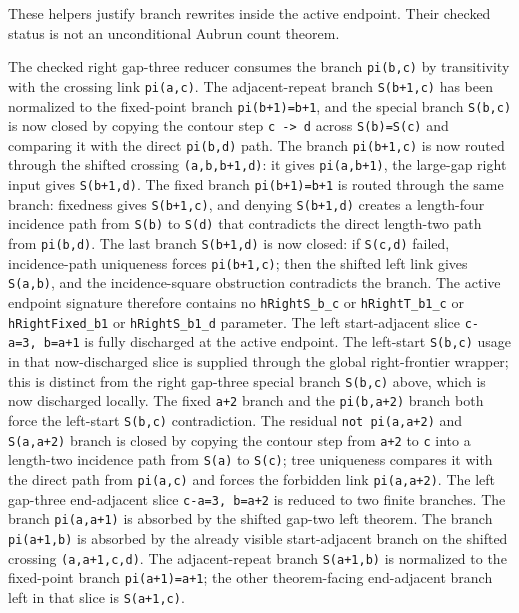 \documentclass[
]{article}
\begin{document}
These helpers justify branch rewrites inside the active endpoint. Their
checked status is not an unconditional Aubrun count theorem.

The checked right gap-three reducer consumes the branch \texttt{pi(b,c)}
by transitivity with the crossing link \texttt{pi(a,c)}. The
adjacent-repeat branch \texttt{S(b+1,c)} has been normalized to the
fixed-point branch \texttt{pi(b+1)=b+1}, and the special branch
\texttt{S(b,c)} is now closed by copying the contour step
\texttt{c\ -\textgreater{}\ d} across \texttt{S(b)=S(c)} and comparing
it with the direct \texttt{pi(b,d)} path. The branch \texttt{pi(b+1,c)}
is now routed through the shifted crossing \texttt{(a,b,b+1,d)}: it
gives \texttt{pi(a,b+1)}, the large-gap right input gives
\texttt{S(b+1,d)}. The fixed branch \texttt{pi(b+1)=b+1} is routed
through the same branch: fixedness gives \texttt{S(b+1,c)}, and denying
\texttt{S(b+1,d)} creates a length-four incidence path from
\texttt{S(b)} to \texttt{S(d)} that contradicts the direct length-two
path from \texttt{pi(b,d)}. The last branch \texttt{S(b+1,d)} is now
closed: if \texttt{S(c,d)} failed, incidence-path uniqueness forces
\texttt{pi(b+1,c)}; then the shifted left link gives \texttt{S(a,b)},
and the incidence-square obstruction contradicts the branch. The active
endpoint signature therefore contains no \texttt{hRightS\_b\_c} or
\texttt{hRightT\_b1\_c} or \texttt{hRightFixed\_b1} or
\texttt{hRightS\_b1\_d} parameter. The left start-adjacent slice
\texttt{c-a=3,\ b=a+1} is fully discharged at the active endpoint. The
left-start \texttt{S(b,c)} usage in that now-discharged slice is
supplied through the global right-frontier wrapper; this is distinct
from the right gap-three special branch \texttt{S(b,c)} above, which is
now discharged locally. The fixed \texttt{a+2} branch and the
\texttt{pi(b,a+2)} branch both force the left-start \texttt{S(b,c)}
contradiction. The residual \texttt{not\ pi(a,a+2)} and
\texttt{S(a,a+2)} branch is closed by copying the contour step from
\texttt{a+2} to \texttt{c} into a length-two incidence path from
\texttt{S(a)} to \texttt{S(c)}; tree uniqueness compares it with the
direct path from \texttt{pi(a,c)} and forces the forbidden link
\texttt{pi(a,a+2)}. The left gap-three end-adjacent slice
\texttt{c-a=3,\ b=a+2} is reduced to two finite branches. The branch
\texttt{pi(a,a+1)} is absorbed by the shifted gap-two left theorem. The
branch \texttt{pi(a+1,b)} is absorbed by the already visible
start-adjacent branch on the shifted crossing \texttt{(a,a+1,c,d)}. The
adjacent-repeat branch \texttt{S(a+1,b)} is normalized to the
fixed-point branch \texttt{pi(a+1)=a+1}; the other theorem-facing
end-adjacent branch left in that slice is \texttt{S(a+1,c)}.
\end{document}
